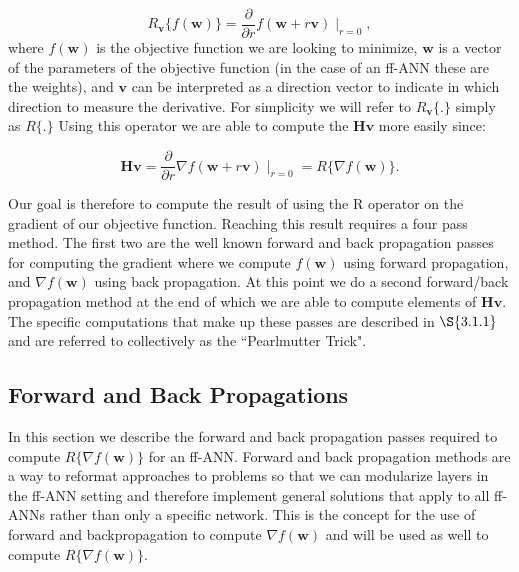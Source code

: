 \documentclass[letterpaper,12pt,titlepage,oneside,final]{book}
\begin{document}
	\begin{equation}
	R_{\mathbf{v}}\{f(\mathbf{w})\} = \frac{\partial}{\partial r}f(\mathbf{w} + r\mathbf{v})\mid_{r=0} ,
	\end{equation}
	where $f(\mathbf{w})$ is the objective function we are looking to minimize, $\mathbf{w}$ is a vector of the parameters of the objective function (in the case of an ff-ANN these are the weights), and $\mathbf{v}$ can be interpreted as a direction vector to indicate in which direction to measure the derivative. For simplicity we will refer to $R_{\mathbf{v}}\{.\}$ simply as $R\{.\}$ Using this operator we are able to compute the $\mathbf{Hv}$ more easily since:
	
	\begin{equation}
	\mathbf{Hv} = \frac{\partial}{\partial r}\nabla{f}(\mathbf{w} + r\mathbf{v})\mid_{r=0} = R\{\nabla{f(\mathbf{w})}\}.
	\end{equation}
	
	Our goal is therefore to compute the result of using the R operator on the gradient of our objective function. Reaching this result requires a four pass method. The first two are the well known forward and back propagation passes for computing the gradient where we compute $f(\mathbf{w})$ using forward propagation, and $\nabla{f(\mathbf{w})}$ using back propagation. At this point we do a second forward/back propagation method at the end of which we are able to compute elements of $\mathbf{Hv}$.  The specific computations that make up these passes are described in $\S{3.1.1}$ and are referred to collectively as the ``Pearlmutter Trick".  
	
	\subsection{Forward and Back Propagations}
	
	In this section we describe the forward and back propagation passes required to compute $R\{\nabla{f(\mathbf{w})}\}$ for an ff-ANN. Forward and back propagation methods are a way to reformat approaches to problems so that we can modularize layers in the ff-ANN setting and therefore implement general solutions that apply to all ff-ANNs rather than only a specific network. This is the concept for the use of forward and backpropagation to compute $\nabla{f(\mathbf{w})}$ and will be used as well to compute $R\{\nabla{f(\mathbf{w})}\}$.
	
\end{document}
